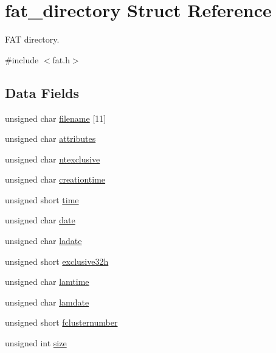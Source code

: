 \hypertarget{a00061}{}\section{fat\+\_\+directory Struct Reference}
\label{a00061}


F\+AT directory.  




{\ttfamily \#include $<$fat.\+h$>$}

\subsection*{Data Fields}
\begin{DoxyCompactItemize}
\item 
unsigned char \hyperlink{a00061_a3aa1ec680c1e61f39705971ebd603064_a3aa1ec680c1e61f39705971ebd603064}{filename} \mbox{[}11\mbox{]}
\item 
unsigned char \hyperlink{a00061_aa516fe54146f6dcb3bdb75721f5f03d0_aa516fe54146f6dcb3bdb75721f5f03d0}{attributes}
\item 
unsigned char \hyperlink{a00061_ad259390d9a31a807cdff543b5b10d9f5_ad259390d9a31a807cdff543b5b10d9f5}{ntexclusive}
\item 
unsigned char \hyperlink{a00061_ab588da02acbe9c2caf2f85828a162fcc_ab588da02acbe9c2caf2f85828a162fcc}{creationtime}
\item 
unsigned short \hyperlink{a00061_a2bfa6f8f103ed1d1ecbab0bc2ed5b650_a2bfa6f8f103ed1d1ecbab0bc2ed5b650}{time}
\item 
unsigned char \hyperlink{a00061_aa80d47ffcb829a15327d9ac115d29e9d_aa80d47ffcb829a15327d9ac115d29e9d}{date}
\item 
unsigned char \hyperlink{a00061_a5dacf198248cb94039288acadd947558_a5dacf198248cb94039288acadd947558}{ladate}
\item 
unsigned short \hyperlink{a00061_a9b2f091174646904538b4b958cfe5ddb_a9b2f091174646904538b4b958cfe5ddb}{exclusive32h}
\item 
unsigned char \hyperlink{a00061_aa010db7b1599af6f1e7ee527219c9f8d_aa010db7b1599af6f1e7ee527219c9f8d}{lamtime}
\item 
unsigned char \hyperlink{a00061_a9aef03a8fc10dd13abe417d792313fc1_a9aef03a8fc10dd13abe417d792313fc1}{lamdate}
\item 
unsigned short \hyperlink{a00061_a67f658abd71861ae6a149238387399e8_a67f658abd71861ae6a149238387399e8}{fclusternumber}
\item 
unsigned int \hyperlink{a00061_a08766899120efa9bd031afe12edad492_a08766899120efa9bd031afe12edad492}{size}
\end{DoxyCompactItemize}


